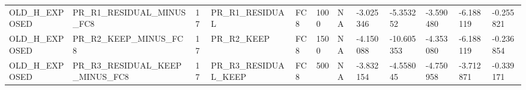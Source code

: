 \begin{tabular}{llllllllllll}
OLD\_H\_EXPOSED & PR\_R1\_RESIDUAL\_MINUS\_FC8 & 17 & PR\_R1\_RESIDUAL & FC8 & 1000 & NA & -3.025346 & -5.353252 & -3.590480 & -6.188119 & -0.255821 \\
OLD\_H\_EXPOSED & PR\_R2\_KEEP\_MINUS\_FC8 & 17 & PR\_R2\_KEEP & FC8 & 1500 & NA & -4.150088 & -10.605353 & -4.353080 & -6.188119 & -0.236854 \\
OLD\_H\_EXPOSED & PR\_R3\_RESIDUAL\_KEEP\_MINUS\_FC8 & 17 & PR\_R3\_RESIDUAL\_KEEP & FC8 & 500 & NA & -3.832154 & -4.558045 & -4.750958 & -3.712871 & -0.339171 \\
\bottomrule
\end{tabular}
